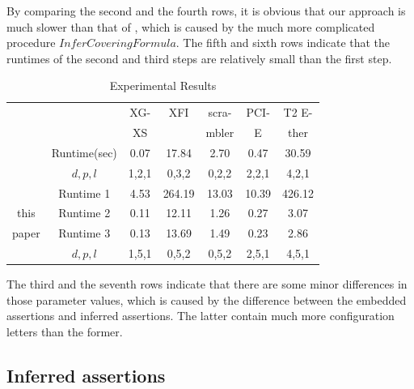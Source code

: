 \documentclass[journal]{IEEEtran}
\begin{document}
By comparing the second and the fourth rows,
it is obvious that our approach is much slower than that of \cite{ShengYuShen:tcad11},
which is caused by the much more complicated procedure $InferCoveringFormula$.
The fifth and sixth rows indicate that the runtimes of the second and third steps are relatively small than the first step.
\begin{table}[t]
\centering
\caption{Experimental Results}
\begin{tabular}{|c|c|c|c|c|c|c|}
\hline
&                                        &XG-     &XFI       &scra-     &PCI-    &T2 E-\\
&                                        &XS      &          &mbler     &E       &ther\\\hline
\cite{ShengYuShen:tcad11}&Runtime(sec)   &0.07    &17.84     &2.70      &0.47    &30.59\\\cline{2-7}
&$d,p,l$                                 &1,2,1   &0,3,2     &0,2,2     &2,2,1   &4,2,1         \\ \hline\hline
    &Runtime 1                           &4.53    & 264.19   &13.03     &10.39   &426.12      \\\cline{2-7}
this&Runtime 2                           &0.11    & 12.11    &1.26      &0.27    &3.07      \\\cline{2-7}
paper&Runtime 3                          &0.13    &13.69     &1.49      &0.23    &2.86      \\\cline{2-7}
    &$d,p,l$                             &1,5,1   &0,5,2     &0,5,2     &2,5,1   &4,5,1          \\ \hline %
\end{tabular}\label{tab_res}
\end{table}

The third and the seventh rows indicate that there are some minor differences in those parameter values,
which is caused by the difference between the embedded assertions and inferred assertions.
The latter contain much more configuration letters than the former.

\subsection{Inferred assertions}
\end{document}
